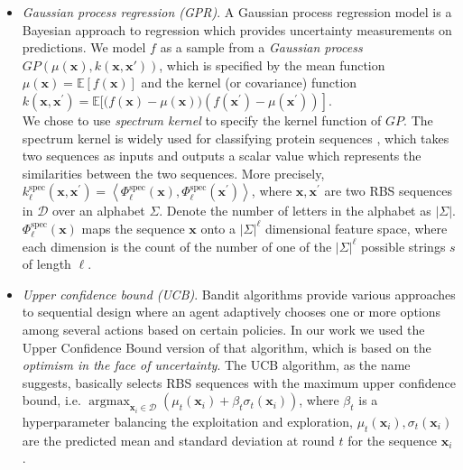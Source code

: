 \begin{itemize}
    \item \textit{Gaussian process regression (GPR)}.
    A Gaussian process regression model \cite{Rasmussen2004} is a Bayesian approach to regression which provides uncertainty measurements on predictions. 
    We model $f$ as a sample from a \textit{Gaussian process} $GP(\mu(\mathbf{x}), k(\mathbf{x}, \mathbf{x'}))$, which is specified by the mean function $\mu(\mathbf{x})=\mathbb{E}[f(\mathbf{x})]$ and the kernel (or covariance) function $k\left(\mathbf{x}, \mathbf{x}^{\prime}\right)=\mathbb{E}[(f(\mathbf{x})-\left.\mu(\mathbf{x}))\left(f\left(\mathbf{x}^{\prime}\right)-\mu\left(\mathbf{x}^{\prime}\right)\right)\right]$.\\
    We chose to use \textit{spectrum kernel} \cite{leslie2001spectrum} to specify the kernel function of $GP$.  
    The spectrum kernel is widely used for classifying protein sequences \cite{leslie2001spectrum, ben2008support}, which takes two sequences as inputs and outputs a scalar value which represents the similarities between the two sequences. More precisely, $k_\ell^{\text{spec}}(\textbf{x}, \textbf{x}^\prime) =\left\langle\Phi_{\ell}^{\mathrm{spec}}(\mathbf{x}), \Phi_{\ell}^{\mathrm{spec}}\left(\mathbf{x}^{\prime}\right)\right\rangle$, where $\mathbf{x}, \mathbf{x}^\prime$ are two RBS sequences in $\mathcal{D}$ over an alphabet $\Sigma$. Denote the number of letters in the alphabet as $|\Sigma|$. $\Phi_{\ell}^{\mathrm{spec}}(\mathbf{x})$ maps the sequence $\textbf{x}$ onto a $|\Sigma|^\ell$ dimensional feature space, where each dimension is the count of the number of one of the $|\Sigma|^\ell$ possible strings $s$ of length $\ell$.
    
    
    \item \textit{Upper confidence bound (UCB)}. Bandit algorithms \cite{lattimore2018bandit} provide various approaches to sequential design where an agent adaptively chooses one or more options among several actions based on certain policies. In our work we used the Upper Confidence Bound version of that algorithm, which is based on the \textit{optimism in the face of uncertainty}. The UCB algorithm, as the name suggests, basically selects RBS sequences with the maximum upper confidence bound, i.e. $\operatorname{argmax}_{\mathbf{x}_i \in \mathcal{D}} \left( \mu_t(\mathbf{x}_i) + \beta_t \sigma_t(\mathbf{x}_i)\right)$,
    where $\beta_t$ is a hyperparameter balancing the exploitation and exploration, 
    $\mu_t(\mathbf{x}_i), \sigma_t(\mathbf{x}_i)$ are the predicted mean and standard deviation at round $t$ for the sequence $\mathbf{x}_i$. 
\end{itemize}

